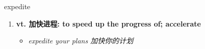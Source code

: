 
\begin{frame}
{\huge expedite}
\begin{center}
\begin{enumerate}\Large
  \item \textbf{vt. 加快进程: to speed up the progress of; accelerate}
  \begin{itemize}
    \item \em{\Large{expedite your plans 加快你的计划}}
  \end{itemize}
\end{enumerate}
\end{center}
\end{frame}
